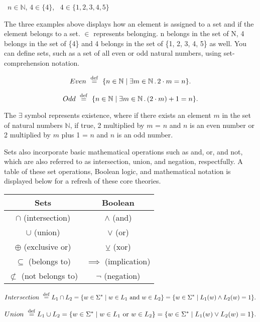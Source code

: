 \documentclass{article}
\begin{document}
\begin{center}
\ $n\in \mathbb N$, $4\in \{4\}$, \ $4\in \{1, 2, 3, 4, 5\}$
\end{center}

\noindent
The three examples above displays how an element is assigned to a set and if the element belongs to a set. $\in$ represents belonging. n belongs in the set of N, 4 belongs in the set of \{4\} and 4 belongs in the set of \{1, 2, 3, 4, 5\} as well. You can define sets, such as a set of all even or odd natural numbers, using set-comprehension notation.

 $$Even \ \stackrel{\rm def}{=} \ \{ n\in\mathbb N \mid \exists  m\in\mathbb N\,.\, 2\cdot m = n \}.$$

$$Odd \ \stackrel{\rm def}{=} \ \{ n\in\mathbb N \mid \exists  m\in\mathbb N\,.\, (2\cdot m) + 1 = n \}.$$

\noindent The $\exists$ symbol represents existence, where if there exists an element $m$ in the set of natural numbers $\mathbb N$, if true, 2 multiplied by $m$ = $n$ and $n$ is an even number or 2 multiplied by $m$ plus 1 = $n$ and $n$ is an odd number. 

\medskip\noindent
 Sets also incorporate basic mathematical operations such as and, or, and not, which are also referred to as intersection, union, and negation, respectfully. A table of these set operations, Boolean logic, and mathematical notation is displayed below for a refresh of these core theories.

\begin{center}
\begin{tabular}{|c | c|} 
 \hline
 Sets & Boolean \\ [0.5ex] 
 \hline
 $\cap$ (intersection) & $\wedge$ (and)  \\ 
 \hline
 $\cup$ (union) & $\lor$ (or)  \\
 \hline
 $\oplus$ (exclusive or) & $\veebar$ (xor)  \\
 \hline
 $\subseteq$ (belongs to) & $\implies$ (implication) \\
 \hline
 $\not\subset$ (not belongs to) & $\neg$ (negation) \\ [1ex] 
 \hline
\end{tabular}
\end{center}

 $$ Intersection \ \stackrel{\rm def}{=} L_1\cap L_2 = \{w\in\Sigma^\ast \mid w\in L_1 \textrm{ and } w\in L_2\}= \{w\in\Sigma^\ast \mid L_1(w) \wedge L_2(w) = 1\}.$$

 $$ Union \ \stackrel{\rm def}{=} L_1\cup L_2 = \{w\in\Sigma^\ast \mid w\in L_1 \textrm{ or } w\in L_2\}= \{w\in\Sigma^\ast \mid L_1(w) \lor L_2(w) = 1\}.$$
\end{document}
